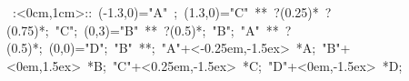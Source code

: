 
\hbox{
\xy    <1cm,0cm>:<0cm,1cm>::
       (-1.3,0)="A" ; (1.3,0)="C" 
       **\dir{-} ?(0.25)*\dir{|} ?(0.75)*\dir{|}; 
       "C"; (0,3)="B" **\dir{-} ?(0.5)*\dir{||};
       "B"; "A" **\dir{-} ?(0.5)*\dir{||};
       (0,0)="D"; "B" **\dir{-};
       "A"+<-0.25em,-1.5ex> *{A};
       "B"+<0em,1.5ex> *{B};
       "C"+<0.25em,-1.5ex> *{C};
       "D"+<0em,-1.5ex> *{D};
       \endxy}
	   
